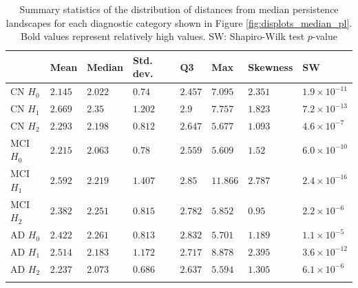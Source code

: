 \documentclass{article}
\begin{document}
\begin{table}
\centering
\begin{tabular}{llllllll}
\toprule
  {} &     Mean &   Median & Std. dev. &       Q3 &       Max & Skewness &    SW \\
\midrule
CN $H_0$  &  $2.145$ &  $2.022$ &             $0.74$ &  $2.457$ &   $7.095$ &  $2.351$ &  $1.9\times10^{-11}$ \\
CN $H_1$  &  $2.669$ &   $2.35$ &            $1.202$ &    $2.9$ &   $7.757$ &  $1.823$ &  $7.2\times10^{-13}$ \\
CN $H_2$  &  $2.293$ &  $2.198$ &            $0.812$ &  $2.647$ &   $5.677$ &  $1.093$ &   $4.6\times10^{-7}$ \\
MCI $H_0$ &  $2.215$ &  $2.063$ &             $0.78$ &  $2.559$ &   $5.609$ &   $1.52$ &  $6.0\times10^{-10}$ \\
  MCI $H_1$ &  $2.592$ &  $2.219$ &            $1.407$ &   $2.85$ &  $11.866$ &  $\mathbf{2.787}$ &  $2.4\times10^{-16}$ \\
MCI $H_2$ &  $2.382$ &  $2.251$ &            $0.815$ &  $2.782$ &   $5.852$ &   $0.95$ &   $2.2\times10^{-6}$ \\
AD $H_0$  &  $2.422$ &  $2.261$ &            $0.813$ &  $2.832$ &   $5.701$ &  $1.189$ &   $1.1\times10^{-5}$ \\
AD $H_1$  &  $2.514$ &  $2.183$ &            $1.172$ &  $2.717$ &   $8.878$ &  $\mathbf{2.395}$ &  $3.6\times10^{-12}$ \\
AD $H_2$  &  $2.237$ &  $2.073$ &            $0.686$ &  $2.637$ &   $5.594$ &  $1.305$ &   $6.1\times10^{-6}$ \\
  \bottomrule
  \vspace{1pt}
\end{tabular}
  \caption{Summary statistics of the distribution of distances from median persistence landscapes for
each diagnostic category shown in Figure \ref{fig:displots_median_pl}. Bold values represent
relatively high values. SW: Shapiro-Wilk test $p$-value}
\label{tab:stats_median_pl}
\end{table}
\end{document}
